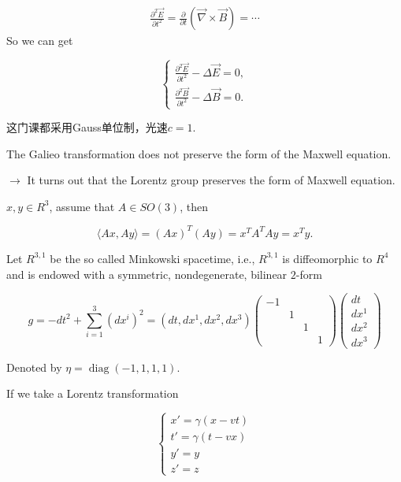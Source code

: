 \begin{equation*}
    \begin{aligned}
        \frac{\partial^2 \vec{E}}{\partial t^2}=\frac{\partial}{\partial t}(\vec{\nabla} \times \vec{B})=\cdots
    \end{aligned}
\end{equation*}
So we can get

\begin{equation*}
    \begin{cases}
        \frac{\partial^2 \vec{E}}{\partial t^2}-\Delta \vec{E}=0,\\
         \frac{\partial^2 \vec{B}}{\partial t^2}-\Delta \vec{B}=0.
    \end{cases}
\end{equation*}
\begin{remark}
    这门课都采用Gauss单位制，光速$c=1$.
\end{remark}


The Galieo transformation does not preserve the form of the Maxwell equation.

\(\rightarrow\) It turns out that the Lorentz group preserves the form of Maxwell equation.

\(x, y \in R^3\), assume that \(A \in SO(3)\), then

\[\langle Ax, Ay \rangle= (Ax)^T(Ay) = x^TA^TAy = x^Ty.\]

Let \(R^{3,1}\) be the so called Minkowski spacetime, i.e.,
$R^{3,1}$ is diffeomorphic to  $ R^4$  and is endowed with
a symmetric, nondegenerate, bilinear $2$-form

\[g = -dt^2 + \sum_{i=1}^3 (dx^i)^2 = (dt, dx^1, dx^2, dx^3)\begin{pmatrix}
    -1&&&\\
    &1&&\\
    &&1&\\
    &&&1
\end{pmatrix}\begin{pmatrix}
    dt\\dx^1\\dx^2\\dx^3
\end{pmatrix}\]

Denoted by \(\eta = \operatorname{diag}(-1,1,1,1)\).

If we take a Lorentz transformation

\begin{equation*}
    \begin{cases}
        x'=\gamma(x-vt)\\
        t'=\gamma(t-vx)\\
        y'=y\\
        z'=z
    \end{cases}
\end{equation*}



